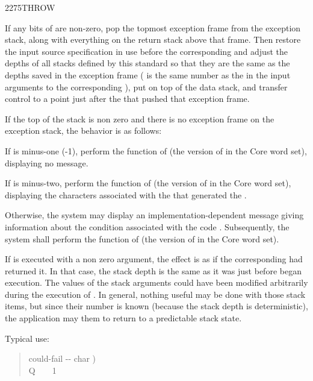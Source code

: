 \begin{worddef}{2275}{THROW}
\item {}

	If any bits of  are non-zero, pop the topmost exception
	frame from the exception stack, along with everything on the
	return stack above that frame. Then restore the input source
	specification in use before the corresponding 
	and adjust the depths of all stacks defined by this standard
	so that they are the same as the depths saved in the exception
	frame ( is the same number as the  in the input
	arguments to the corresponding ), put  on
	top of the data stack, and transfer control to a point just after
	the  that pushed that exception frame.

	If the top of the stack is non zero and there is no exception
	frame on the exception stack, the behavior is as follows:

	If  is minus-one (-1), perform the function of
	 (the version of  in
	the Core word set), displaying no message.

	If  is minus-two, perform the function of
	 (the version of 
	in the Core word set), displaying the characters 
	associated with the  that generated the
	.

	Otherwise, the system may display an implementation-dependent
	message giving information about the condition associated with
	the  code . Subsequently, the system shall
	perform the function of  (the version
	of  in the Core word set).

	\begin{rationale} %
		If  is executed with a non zero argument, the effect
		is as if the corresponding  had returned it. In that
		case, the stack depth is the same as it was just before 
		began execution. The values of the  stack arguments could
		have been modified arbitrarily during the execution of .
		In general, nothing useful may be done with those stack items, but
		since their number is known (because the stack depth is deterministic),
		the application may  them to return to a predictable
		stack state.

		Typical use:
		\begin{quote}\ttfamily
			\word{:} could-fail  -{}- char ) \\
			\tab {}  \word{[CHAR]} Q \word{=}~
				~ 1 
			\word{;}


\end{quote}
\end{rationale}
\end{worddef}
